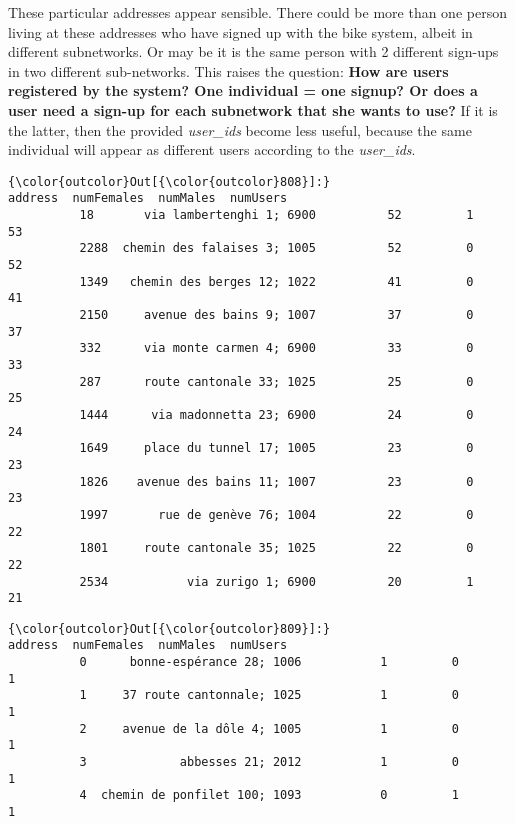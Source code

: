 \documentclass{report}
\begin{document}
    These particular addresses appear sensible. There could be more than one
person living at these addresses who have signed up with the bike
system, albeit in different subnetworks. Or may be it is the same person
with 2 different sign-ups in two different sub-networks. This raises the
question: \textbf{How are users registered by the system? One individual
= one signup? Or does a user need a sign-up for each subnetwork that she
wants to use?} If it is the latter, then the provided \emph{user\_ids}
become less useful, because the same individual will appear as different
users according to the \emph{user\_ids}.


            \begin{Verbatim}[commandchars=\\\{\}]
{\color{outcolor}Out[{\color{outcolor}808}]:}                           address  numFemales  numMales  numUsers
          18       via lambertenghi 1; 6900          52         1        53
          2288  chemin des falaises 3; 1005          52         0        52
          1349   chemin des berges 12; 1022          41         0        41
          2150     avenue des bains 9; 1007          37         0        37
          332      via monte carmen 4; 6900          33         0        33
          287      route cantonale 33; 1025          25         0        25
          1444      via madonnetta 23; 6900          24         0        24
          1649     place du tunnel 17; 1005          23         0        23
          1826    avenue des bains 11; 1007          23         0        23
          1997       rue de genève 76; 1004          22         0        22
          1801     route cantonale 35; 1025          22         0        22
          2534           via zurigo 1; 6900          20         1        21
\end{Verbatim}
        

            \begin{Verbatim}[commandchars=\\\{\}]
{\color{outcolor}Out[{\color{outcolor}809}]:}                         address  numFemales  numMales  numUsers
          0      bonne-espérance 28; 1006           1         0         1
          1     37 route cantonnale; 1025           1         0         1
          2     avenue de la dôle 4; 1005           1         0         1
          3             abbesses 21; 2012           1         0         1
          4  chemin de ponfilet 100; 1093           0         1         1
\end{Verbatim}
        
\end{document}
